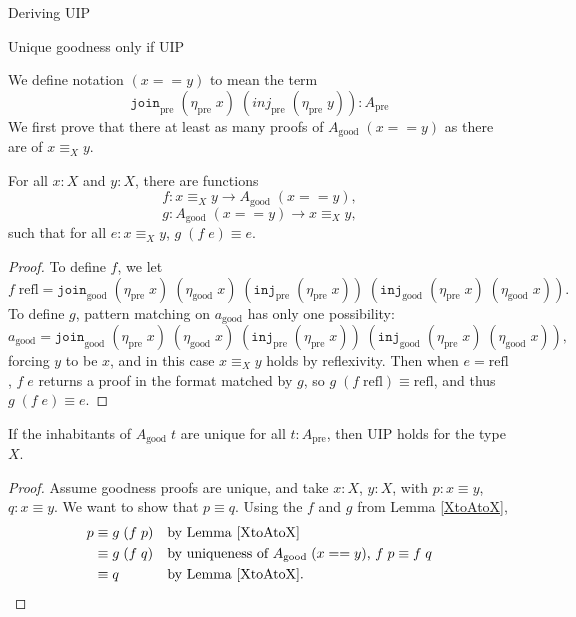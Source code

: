 \documentclass[acmsmall,review]{acmart}\settopmatter{printfolios=true,printccs=false,printacmref=false}
\newcommand{\pre}[1]{{#1}_\text{pre}}
\newcommand{\good}[1]{{#1}_\text{good}}
\newcommand{\Id}[2]{{#1}\equiv{#2}}
\newcommand{\IdA}[3]{{#1}\equiv_{#3}{#2}}
\newcommand{\join}{\texttt{join}}
\newcommand{\inj}{\texttt{inj}}
\begin{document}
\begin{section}{Deriving UIP}
\begin{subsection}{Unique goodness only if UIP}

We define notation $(x == y)$ to mean the term \[\pre{\join}\;(\pre{\eta}\;x)\;(\pre{inj}\;(\pre{\eta}\;y)) : \pre{A}\]
We first prove that there at least as many proofs of $\good{A}\;(x == y)$ as there are of $\IdA{x}{y}{X}$.

\begin{lemma}[$\IdA{x}{y}{X}$ is a retract of $\good{A}$]\label{XtoAtoX}
    For all $x : X$ and $y : X$, there are functions \[f : \IdA{x}{y}{X} \to \good{A}\;(x == y),\]\[g : \good{A}\;(x == y) \to \IdA{x}{y}{X},\] such that for all $e : \IdA{x}{y}{X}$, $\Id{g\;(f\;e)}{e}$.
\end{lemma}
\begin{proof}
    To define $f$, we let \[f\;\text{refl} = \good{\join}\;(\pre{\eta}\;x)\;(\good{\eta}\;x)\;(\pre{\inj}\;(\pre{\eta}\;x))\;(\good{\inj}\;(\pre{\eta}\;x)\;(\good{\eta}\;x)).\] To define $g$, pattern matching on $\good{a}$ has only one possibility: \[\good{a} = \good{\join}\;(\pre{\eta}\;x)\;(\good{\eta}\;x)\;(\pre{\inj}\;(\pre{\eta}\;x))\;(\good{\inj}\;(\pre{\eta}\;x)\;(\good{\eta}\;x)),\] forcing $y$ to be $x$, and in this case $\IdA{x}{y}{X}$ holds by reflexivity.
    Then when $e = \text{refl}$, $f\;e$ returns a proof in the format matched by $g$, so $\Id{g\;(f\;\text{refl})}{\text{refl}}$, and thus $\Id{g\;(f\;e)}{e}$.
\end{proof}

\begin{lemma}
    If the inhabitants of $\good{A}\;t$ are unique for all $t : \pre{A}$, then UIP holds for the type $X$.
\end{lemma}
\begin{proof}
    Assume goodness proofs are unique, and take $x : X$, $y : X$, with $p : \Id{x}{y}$, $q : \Id{x}{y}$. We want to show that $\Id{p}{q}$. Using the $f$ and $g$ from Lemma \ref{XtoAtoX}, \begin{align*}
    p &\equiv g\;(f\;p)&&\text{by Lemma \ref{XtoAtoX}}\\
      &\equiv g\;(f\;q)&&\text{by uniqueness of $\good{A}\;(x == y)$, $\Id{f\;p}{f\;q}$}\\
      &\equiv q&&\text{by Lemma \ref{XtoAtoX}}.
    \end{align*}
\end{proof}

\end{subsection}


\end{section}
\end{document}
